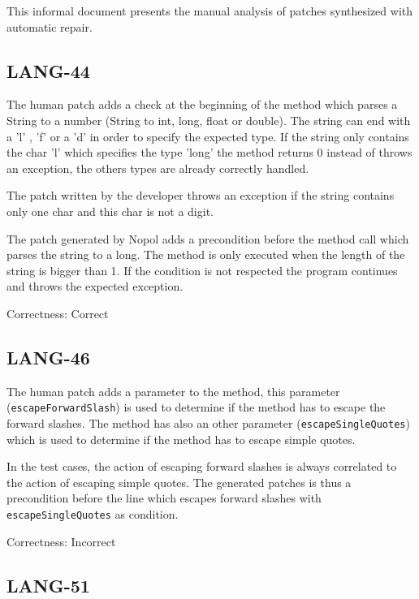 \documentclass{article}
\newcommand{\mycode}[1]{{\small \texttt{#1}}\xspace}
\begin{document}
This informal document presents the manual analysis of patches synthesized with automatic repair.


\subsection{LANG-44} 

The human patch adds a check at the beginning of the method which parses a String to a number (String to int, long, float or double). The string can end with a 'l' , 'f' or a 'd' in order to specify the expected type. If the string only contains the char 'l' which specifies the type 'long' the method returns 0 instead of throws an exception, the others types are already correctly handled.

The patch written by the developer throws an exception if the string contains only one char and this char is not a digit.

The patch generated by Nopol adds a precondition before the method call which parses the string to a long. The method is only executed when the length of the string is bigger than 1. If the condition is not respected the program continues and throws the expected exception.

Correctness: Correct


\subsection{LANG-46}

The human patch adds a parameter to the method, this parameter (\mycode{escapeForwardSlash}) is used to determine if the method has to escape the forward slashes. The method has also an other parameter (\mycode{escapeSingleQuotes}) which is used to determine if the method has to escape simple quotes.

In the test cases, the action of escaping forward slashes is always correlated to the action of escaping simple quotes. 
The generated patches is thus a precondition before the line which escapes forward slashes with \mycode{escapeSingleQuotes} as condition.

Correctness: Incorrect


\subsection{LANG-51}
\end{document}
